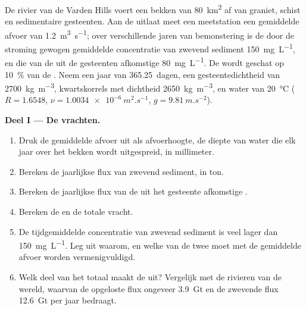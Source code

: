 \begin{problem}
\label{pb:b1:erosion-transport:1}
De rivier van de Varden Hills voert een bekken van \qty{80}{km^2} af van graniet, schist en sedimentaire gesteenten. Aan de uitlaat meet een meetstation een gemiddelde afvoer van \qty{1.2}{m^3.s^{-1}}; over verschillende jaren van bemonstering is de door de stroming gewogen gemiddelde concentratie van zwevend sediment \qty{150}{mg.L^{-1}}, en die van de uit de gesteenten afkomstige  \qty{80}{mg.L^{-1}}. De  wordt geschat op \qty{10}{\percent} van de . Neem een jaar van \num{365.25}~dagen, een gesteentedichtheid van \qty{2700}{kg.m^{-3}}, kwartskorrels met dichtheid \qty{2650}{kg.m^{-3}}, en water van \qty{20}{\celsius} ($R
= 1.6548$, $\nu = \qty{1.0034e-6}{m^2.s^{-1}}$, $g = \qty{9.81}{m.s^{-2}}$).

\medskip
\noindent\textbf{Deel I --- De vrachten.}
\begin{enumerate}
  \item Druk de gemiddelde afvoer uit als afvoerhoogte, de diepte van water die elk jaar over het bekken wordt uitgespreid, in millimeter.
  \item Bereken de jaarlijkse flux van zwevend sediment, in ton.
  \item Bereken de jaarlijkse flux van de uit het gesteente afkomstige .
  \item Bereken de  en de totale vracht.
  \item De tijdgemiddelde concentratie van zwevend sediment is veel lager dan \qty{150}{mg.L^{-1}}. Leg uit waarom, en welke van de twee moet met de gemiddelde afvoer worden vermenigvuldigd.
  \item Welk deel van het totaal maakt de  uit? Vergelijk met de rivieren van de wereld, waarvan de opgeloste flux ongeveer \qty{3.9}{Gt} en de zwevende flux \qty{12.6}{Gt} per jaar bedraagt.
\end{enumerate}


\end{problem}
